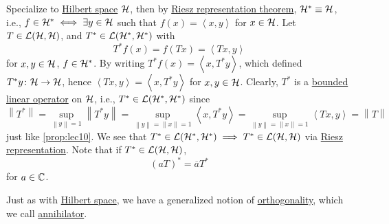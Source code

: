\begin{remark}
	Specialize to \hyperref[def:Hilbert-space]{Hilbert space} \(\mathcal{\MakeUppercase{h}} \), then by \hyperref[thm:Riesz-representation]{Riesz representation theorem}, \(\mathcal{\MakeUppercase{h}} ^{\ast} \equiv \mathcal{\MakeUppercase{h}} \), i.e., \(f\in \mathcal{\MakeUppercase{h}} ^{\ast} \iff \exists y\in \mathcal{\MakeUppercase{h}} \) such that \(f(x) = \left\langle x, y \right\rangle \) for \(x\in \mathcal{\MakeUppercase{h}} \). Let \(T\in \mathcal{\MakeUppercase{l}} (\mathcal{\MakeUppercase{h}} , \mathcal{\MakeUppercase{h}} )\), and \(T^{\ast} \in \mathcal{\MakeUppercase{l}} (\mathcal{\MakeUppercase{h}} ^{\ast} , \mathcal{\MakeUppercase{h}} ^{\ast} )\) with
	\[
		T^{\ast} f(x) = f(Tx) = \left\langle Tx, y \right\rangle
	\]
	for \(x, y\in \mathcal{\MakeUppercase{h}} \), \(f\in \mathcal{\MakeUppercase{h}} ^{\ast} \). By writing \(T^{\ast} f(x) = \left\langle x, T^{\ast} y \right\rangle \), which defined \(T^{\ast} y\colon \mathcal{\MakeUppercase{H}} \to \mathcal{\MakeUppercase{h}} \), hence \(\left\langle Tx, y \right\rangle = \left\langle x, T^{\ast} y \right\rangle  \) for \(x, y\in \mathcal{\MakeUppercase{h}}\). Clearly, \(T^{\ast} \) is a \hyperref[def:bounded-linear-op]{bounded linear operator} on \(\mathcal{\MakeUppercase{h}} \), i.e., \(T^{\ast} \in \mathcal{\MakeUppercase{l}} (\mathcal{\MakeUppercase{h}}^{\ast} , \mathcal{\MakeUppercase{h}}^{\ast} )\) since
	\[
		\left\lVert T^{\ast} \right\rVert
		= \sup _{\left\lVert y\right\rVert = 1} \left\lVert T^{\ast} y\right\rVert
		= \sup _{\left\lVert y\right\rVert = \left\lVert x\right\rVert = 1} \left\langle x, T^{\ast} y \right\rangle
		= \sup _{\left\lVert y\right\rVert = \left\lVert x\right\rVert = 1}\left\langle Tx, y \right\rangle
		= \left\lVert T\right\rVert
	\]
	just like \autoref{prop:lec10}. We see that \(T^{\ast} \in \mathcal{\MakeUppercase{l}} (\mathcal{\MakeUppercase{h}} ^{\ast} , \mathcal{\MakeUppercase{h}} ^{\ast} )\implies T^{\ast} \in \mathcal{\MakeUppercase{l}} (\mathcal{\MakeUppercase{h}} , \mathcal{\MakeUppercase{h}} )\) via \hyperref[thm:Riesz-representation]{Riesz representation}. Note that if \(T^{\ast} \in \mathcal{\MakeUppercase{l}} (\mathcal{\MakeUppercase{h}} , \mathcal{\MakeUppercase{h}} )\),
	\[
		(aT)^{\ast} = \overline{a} T^{\ast}
	\]
	for \(a\in \mathbb{\MakeUppercase{c}} \).
\end{remark}

Just as with \hyperref[def:Hilbert-space]{Hilbert space}, we have a generalized notion of \hyperref[def:orthogonal]{orthogonality}, which we call \hyperref[def:annihilator]{annihilator}.

